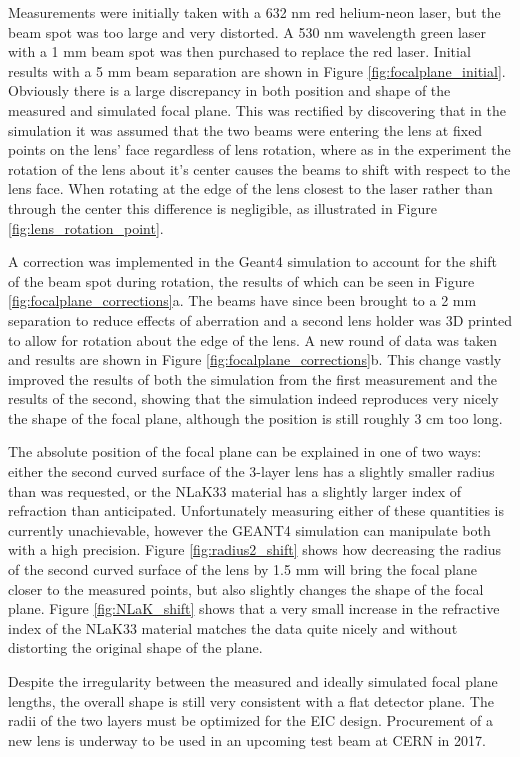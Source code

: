 Measurements were initially taken with a 632 nm red helium-neon laser, but the beam spot was too large and very distorted. A 530 nm wavelength green laser with a 1 mm beam spot was then purchased to replace the red laser. Initial results with a 5 mm beam separation are shown in Figure \ref{fig:focalplane_initial}. Obviously there is a large discrepancy in both position and shape of the measured and simulated focal plane. This was rectified by discovering that in the simulation it was assumed that the two beams were entering the lens at fixed points on the lens' face regardless of lens rotation, where as in the experiment the rotation of the lens about it's center causes the beams to shift with respect to the lens face. When rotating at the edge of the lens closest to the laser rather than through the center this difference is negligible, as illustrated in Figure \ref{fig:lens_rotation_point}.

A correction was implemented in the Geant4 simulation to account for the shift of the beam spot during rotation, the results of which can be seen in Figure \ref{fig:focalplane_corrections}a. The beams have since been brought to a 2 mm separation to reduce effects of aberration and a second lens holder was 3D printed to allow for rotation about the edge of the lens. A new round of data was taken and results are shown in Figure \ref{fig:focalplane_corrections}b. This change vastly improved the results of both the simulation from the first measurement and the results of the second, showing that the simulation indeed reproduces very nicely the shape of the focal plane, although the position is still roughly 3 cm too long.

The absolute position of the focal plane can be explained in one of two ways: either the second curved surface of the 3-layer lens has a slightly smaller radius than was requested, or the NLaK33 material has a slightly larger index of refraction than anticipated. Unfortunately measuring either of these quantities is currently unachievable, however the GEANT4 simulation can manipulate both with a high precision. Figure \ref{fig:radius2_shift} shows how decreasing the radius of the second curved surface of the lens by 1.5 mm will bring the focal plane closer to the measured points, but also slightly changes the shape of the focal plane. Figure \ref{fig:NLaK_shift} shows that a very small increase in the refractive index of the NLaK33 material matches the data quite nicely and without distorting the original shape of the plane.

Despite the irregularity between the measured and ideally simulated focal plane lengths, the overall shape is still very consistent with a flat detector plane. The radii of the two layers must be optimized for the EIC design. Procurement of a new lens is underway to be used in an upcoming test beam at CERN in 2017.


